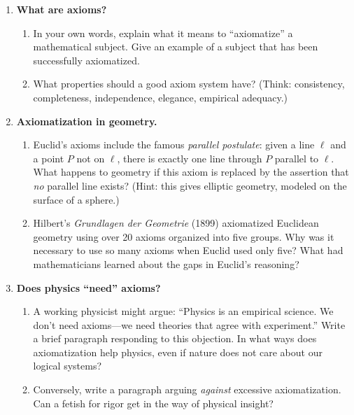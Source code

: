 \begin{enumerate}
    \item \textbf{What are axioms?}
    \begin{enumerate}
        \item In your own words, explain what it means to ``axiomatize'' a mathematical subject. Give an example of a subject that has been successfully axiomatized.
        \item What properties should a good axiom system have? (Think: consistency, completeness, independence, elegance, empirical adequacy.)
    \end{enumerate}

    \item \textbf{Axiomatization in geometry.}
    \begin{enumerate}
        \item Euclid's axioms include the famous \emph{parallel postulate}: given a line $\ell$ and a point $P$ not on $\ell$, there is exactly one line through $P$ parallel to $\ell$. What happens to geometry if this axiom is replaced by the assertion that \emph{no} parallel line exists? (Hint: this gives elliptic geometry, modeled on the surface of a sphere.)
        \item Hilbert's \emph{Grundlagen der Geometrie} (1899) axiomatized Euclidean geometry using over 20 axioms organized into five groups. Why was it necessary to use so many axioms when Euclid used only five? What had mathematicians learned about the gaps in Euclid's reasoning?
    \end{enumerate}

    \item \textbf{Does physics ``need'' axioms?}
    \begin{enumerate}
        \item A working physicist might argue: ``Physics is an empirical science. We don't need axioms---we need theories that agree with experiment.'' Write a brief paragraph responding to this objection. In what ways does axiomatization help physics, even if nature does not care about our logical systems?
        \item Conversely, write a paragraph arguing \emph{against} excessive axiomatization. Can a fetish for rigor get in the way of physical insight?
    \end{enumerate}


\end{enumerate}
